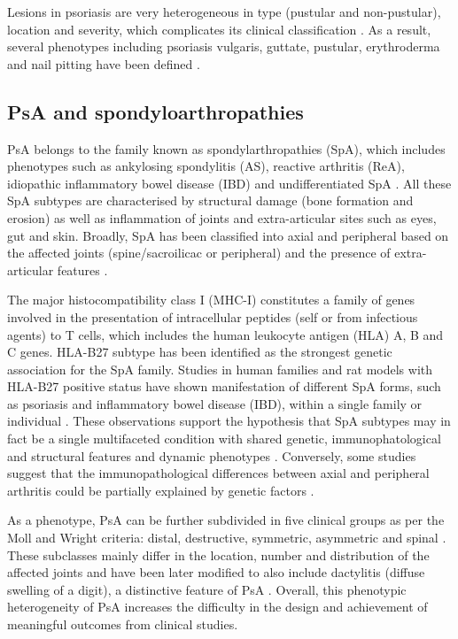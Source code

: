 Lesions in psoriasis are very heterogeneous in type (pustular and non-pustular), location and severity, which complicates its clinical classification \parencite{Perera2012}. As a result, several phenotypes including psoriasis vulgaris, guttate, pustular, erythroderma and nail pitting have been defined \parencite{Marrakchi2011}.



\subsection{PsA and spondyloarthropathies}
%
PsA belongs to the family known as spondylarthropathies (SpA), which includes phenotypes such as ankylosing spondylitis (AS), reactive arthritis (ReA), idiopathic inflammatory bowel disease (IBD) and undifferentiated SpA \parencite{Baeten2013}. All these SpA subtypes are characterised by structural damage (bone formation and erosion) as well as inflammation of joints and extra-articular sites such as eyes, gut and skin. Broadly, SpA has been classified into axial and peripheral based on the affected joints (spine/sacroilicac or peripheral) and the presence of extra-articular features \parencite{Runwaleit2001, Runwaleit2001}. 


The major histocompatibility class I (MHC-I) constitutes a family of genes involved in the presentation of intracellular peptides (self or from infectious agents) to T cells, which includes the human leukocyte antigen (HLA) A, B and C genes. HLA-B27 subtype has been identified as the strongest genetic association for the SpA family. Studies in human families and rat models with HLA-B27 positive status have shown manifestation of different SpA forms, such as psoriasis and inflammatory bowel disease (IBD), within a single family or individual \parencite{Hammer1990,Said-Nahal2000}. These observations support the hypothesis that SpA subtypes may in fact be a single multifaceted condition with shared genetic, immunophatological and structural features and dynamic phenotypes \parencite{Baeten2013}. Conversely, some studies suggest that the immunopathological differences between axial and peripheral arthritis could be partially explained by genetic factors \parencite{Porcher2005, Appel2011, Noordenbos2012}.

As a phenotype, PsA can be further subdivided in five clinical groups as per the Moll and Wright criteria: distal, destructive, symmetric, asymmetric and spinal \parencite{Moll1973}. These subclasses mainly differ in the location, number and distribution of the affected joints and have been later modified to also include dactylitis (diffuse swelling of a digit), a distinctive feature of PsA \parencite{Reich2009}. Overall, this phenotypic heterogeneity of PsA increases the difficulty in the design and achievement of meaningful outcomes from clinical studies.




